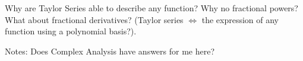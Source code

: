 

Why are Taylor Series able to describe any function? Why no fractional
powers? What about fractional derivatives? (Taylor series
    $\Leftrightarrow$ the expression of any function using a polynomial
    basis?). 

Notes: Does Complex Analysis have answers for me here?

